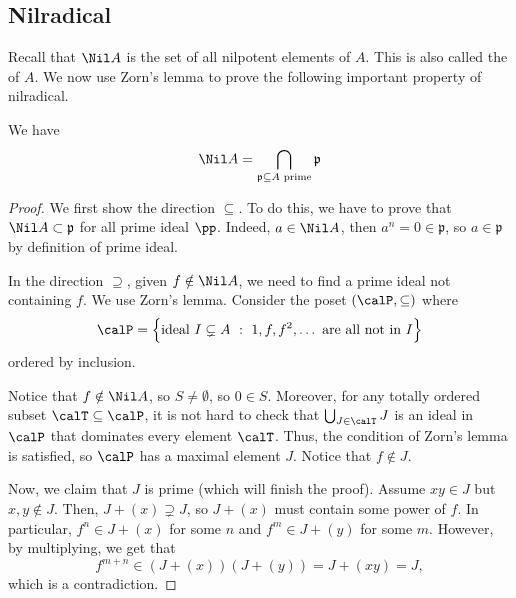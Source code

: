 \subsection{Nilradical}
Recall that $\Nil A$ is the set of all nilpotent
elements of $A$.
This is also called the  of $A$.
We now use Zorn's lemma to prove the following 
important property of nilradical.
\begin{theorem}
    \label{prop:nilradical} We have
    $$\Nil A = \bigcap_{\mathfrak p\subseteq A
    \text{ prime}}\mathfrak p$$ 
\end{theorem}
\begin{proof}
    We first show the direction $\subseteq$.
    To do this, we have to prove that
    $\Nil A\subset\mathfrak p$ for all prime ideal $\pp$.
    Indeed, $a\in\Nil A$, then $a^n=0\in\mathfrak p$,
    so $a\in\mathfrak p$ by definition of prime ideal.

    In the direction $\supseteq$,
    given $f\notin\Nil A$, we need to find a prime ideal
    not containing $f$.
    We use Zorn's lemma. Consider the poset $(\calP,\subseteq)$ where
    $$\calP = 
    \Big\{\text{ideal } I\subsetneq A\ :\ 1,f,f^2,\dots 
    \text{ are all not in } I
    \Big\}$$
    ordered by inclusion.
    
    Notice that $f\notin\Nil A$, so $S\neq\emptyset$,
    so $0\in S$. Moreover, for any totally ordered subset 
    $\calT\subseteq \calP$, it is not hard to check that
    $\bigcup_{J\in\calT} J$ is an ideal in $\calP$
    that dominates every element $\calT$.
    Thus, the condition of Zorn's lemma is satisfied,
    so $\calP$ has a maximal element $J$.
    Notice that $f\notin J$.

    Now, we claim that $J$ is prime
    (which will finish the proof).
    Assume $xy\in J$ but $x,y\notin J$.
    Then, $J+(x)\supsetneq J$, so $J+(x)$ must contain
    some power of $f$.
    In particular, $f^n\in J+(x)$ for some $n$
    and $f^m\in J+(y)$ for some $m$.
    However, by multiplying, we get that
    $$f^{m+n}\in (J+(x))(J+(y)) =  J+(xy)
    = J,$$ 
    which is a contradiction.
\end{proof}
%
%
%
